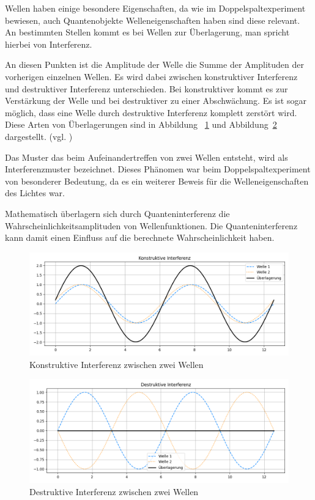 Wellen haben einige besondere Eigenschaften, da wie im Doppelspaltexperiment bewiesen, auch Quantenobjekte Welleneigenschaften haben sind diese relevant. An bestimmten Stellen kommt es bei Wellen zur Überlagerung, man spricht hierbei von Interferenz.


An diesen Punkten ist die Amplitude der Welle die Summe der Amplituden der vorherigen einzelnen Wellen. Es wird dabei zwischen konstruktiver Interferenz und destruktiver Interferenz unterschieden. Bei konstruktiver kommt es zur Verstärkung der Welle und bei destruktiver zu einer Abschwächung. Es ist sogar möglich, dass eine Welle durch destruktive Interferenz komplett zerstört wird. Diese Arten von Überlagerungen sind in Abbildung ~\ref{fig:Interferenz_Konstruktiv} und Abbildung~\ref{fig:Interferenz_Destruktiv} dargestellt. (vgl. \cite[Ch. 2.1.3]{schmitz_particles_2022})


Das Muster das beim Aufeinandertreffen von zwei Wellen entsteht, wird als Interferenzmuster bezeichnet. Dieses Phänomen war beim Doppelspaltexperiment von besonderer Bedeutung, da es ein weiterer Beweis für die Welleneigenschaften des Lichtes war.


Mathematisch überlagern sich durch Quanteninterferenz die Wahrscheinlichkeitsamplituden von Wellenfunktionen. Die Quanteninterferenz kann damit einen Einfluss auf die berechnete Wahrscheinlichkeit haben.


\begin{figure}[H]
    \centering
    \includegraphics[width=1\linewidth]{images/physics/Interferenz_Konstruktiv.png}
    \caption{Konstruktive Interferenz zwischen zwei Wellen}
    \label{fig:Interferenz_Konstruktiv}
\end{figure}

\begin{figure}[H]
    \centering
    \includegraphics[width=1\linewidth]{images/physics/Interferenz_Destruktiv.png}
    \caption{Destruktive Interferenz zwischen zwei Wellen}
    \label{fig:Interferenz_Destruktiv}
\end{figure}

